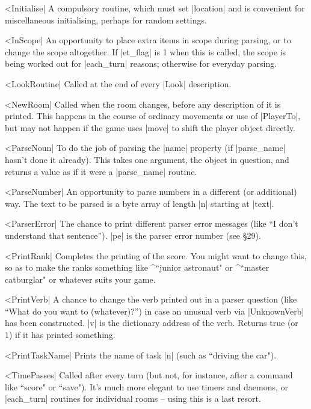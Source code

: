 ^^|Initialise|
A compulsory routine, which must set |location| and is convenient for
miscellaneous initialising, perhaps for random settings.

^^|InScope|
An opportunity to place extra items in scope during parsing, or to change
the scope altogether.  If |et_flag| is 1 when this is called, the scope is
being worked out for |each_turn| reasons; otherwise for everyday parsing.

^^|LookRoutine|
Called at the end of every |Look| description.

^^|NewRoom|
Called when the room changes, before any description of it is printed.  This
happens in the course of ordinary movements or use of |PlayerTo|, but may
not happen if the game uses |move| to shift the player object directly.

^^|ParseNoun|
To do the job of parsing the |name| property (if |parse_name| hasn't done
it already).  This takes one argument, the object in question, and returns
a value as if it were a |parse_name| routine.

^^|ParseNumber|
An opportunity to parse numbers in a different (or additional) way.  The
text to be parsed is a byte array of length |n| starting at |text|.

^^|ParserError|
The chance to print different parser error messages (like ``I don't
understand that sentence'').  |pe| is the parser error number (see \S 29).

^^|PrintRank|
Completes the printing of the score.  You might want to change this, so as
to make the ranks something like ^{``junior astronaut"} or ^{``master
catburglar"} or whatever suits your game.

^^|PrintVerb|
A chance to change the verb printed out in a parser question (like ``What do
you want to (whatever)?'') in case an unusual verb via |UnknownVerb| has
been constructed.  |v| is the dictionary address of the verb.
Returns true (or 1) if it has printed something.

^^|PrintTaskName|
Prints the name of task |n| (such as ``driving the car").

^^|TimePasses|
Called after every turn (but not, for instance, after a command like
``score" or ``save").  It's much more elegant to use timers and daemons, or
|each_turn| routines for individual rooms -- using this is a last resort.

